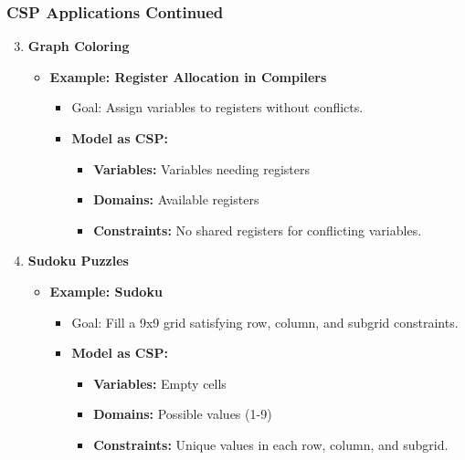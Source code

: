 \documentclass[aspectratio=169]{beamer}
\begin{document}
\begin{frame}[fragile]
    \frametitle{CSP Applications Continued}
    \begin{enumerate}
        \setcounter{enumi}{2}
        \item \textbf{Graph Coloring}
        \begin{itemize}
            \item \textbf{Example: Register Allocation in Compilers}
            \begin{itemize}
                \item Goal: Assign variables to registers without conflicts.
                \item \textbf{Model as CSP:}
                \begin{itemize}
                    \item \textbf{Variables:} Variables needing registers
                    \item \textbf{Domains:} Available registers
                    \item \textbf{Constraints:} No shared registers for conflicting variables.
                \end{itemize}
            \end{itemize}
        \end{itemize}
        \item \textbf{Sudoku Puzzles}
        \begin{itemize}
            \item \textbf{Example: Sudoku}
            \begin{itemize}
                \item Goal: Fill a 9x9 grid satisfying row, column, and subgrid constraints.
                \item \textbf{Model as CSP:}
                \begin{itemize}
                    \item \textbf{Variables:} Empty cells
                    \item \textbf{Domains:} Possible values (1-9)
                    \item \textbf{Constraints:} Unique values in each row, column, and subgrid.
                \end{itemize}
            \end{itemize}
        \end{itemize}
    \end{enumerate}
\end{frame}
\end{document}
